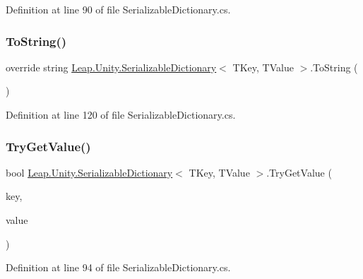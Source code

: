 Definition at line 90 of file Serializable\+Dictionary.\+cs.

\mbox{\label{class_leap_1_1_unity_1_1_serializable_dictionary_a4756832a6c1b8f6c6a88f3d465583132}} 
\subsubsection{\texorpdfstring{ToString()}{ToString()}}
{\footnotesize\ttfamily override string \mbox{\hyperlink{class_leap_1_1_unity_1_1_serializable_dictionary}{Leap.\+Unity.\+Serializable\+Dictionary}}$<$ T\+Key, T\+Value $>$.To\+String (\begin{DoxyParamCaption}{ }\end{DoxyParamCaption})}



Definition at line 120 of file Serializable\+Dictionary.\+cs.

\mbox{\label{class_leap_1_1_unity_1_1_serializable_dictionary_a2e1b99c2ddcefc2fb599290ac3158690}} 
\subsubsection{\texorpdfstring{TryGetValue()}{TryGetValue()}}
{\footnotesize\ttfamily bool \mbox{\hyperlink{class_leap_1_1_unity_1_1_serializable_dictionary}{Leap.\+Unity.\+Serializable\+Dictionary}}$<$ T\+Key, T\+Value $>$.Try\+Get\+Value (\begin{DoxyParamCaption}\item[{T\+Key}]{key,  }\item[{out T\+Value}]{value }\end{DoxyParamCaption})}



Definition at line 94 of file Serializable\+Dictionary.\+cs.




